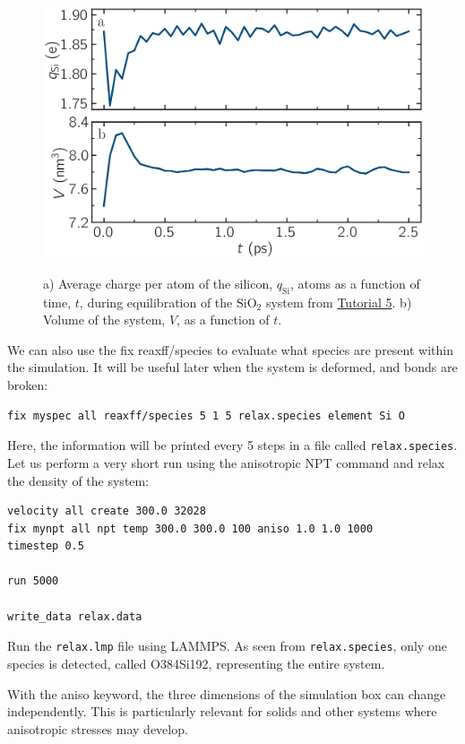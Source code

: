 \documentclass[9pt,tutorial]{livecoms}
\newcommand{\lmpcmd}[1]{\colorbox{listing}{\textcolor{command}{\small{#1}}}} %
\newcommand{\flecmd}[1]{\textcolor{command}{\texttt{#1}}} %
\begin{document}
\begin{figure}
\centering
\includegraphics[width=\linewidth]{SIO-charge}\\[-2ex]
\caption{a) Average charge per atom of the silicon, $q_\text{Si}$, atoms as
a function of time, $t$, during equilibration of the $\text{SiO}_2$ system
from \hyperref[reactive-silicon-dioxide-label]{Tutorial 5}.  b) Volume of the
system, $V$, as a function of $t$.}
\label{fig:SIO-charge}
\end{figure}

We can also use the \lmpcmd{fix reaxff/species} to evaluate what species are
present within the simulation.  It will be useful later when the system is deformed,
and bonds are broken:
\begin{lstlisting}
fix myspec all reaxff/species 5 1 5 relax.species element Si O
\end{lstlisting}
Here, the information will be printed every 5 steps in a file called \flecmd{relax.species}.
Let us perform a very short run using the anisotropic NPT command and relax the
density of the system:
\begin{lstlisting}
velocity all create 300.0 32028
fix mynpt all npt temp 300.0 300.0 100 aniso 1.0 1.0 1000
timestep 0.5

run 5000

write_data relax.data
\end{lstlisting}
Run the \flecmd{relax.lmp} file using LAMMPS.  As seen from \flecmd{relax.species},
only one species is detected, called \lmpcmd{O384Si192}, representing the entire system.

\begin{note}
{\color{blue}With the \lmpcmd{aniso} keyword, the three dimensions of the simulation
box can change independently.  This is particularly relevant for solids and other
systems where anisotropic stresses may develop.}
\end{note}
\end{document}
